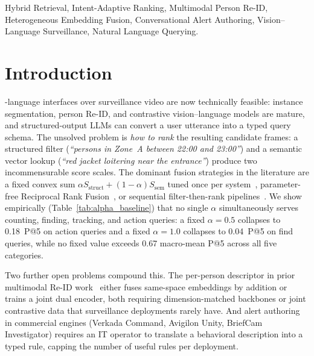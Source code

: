 ﻿\documentclass[conference]{IEEEtran}
\theoremstyle{definition}
\begin{document}
\begin{IEEEkeywords}
Hybrid Retrieval, Intent-Adaptive Ranking, Multimodal Person Re-ID, Heterogeneous Embedding Fusion, Conversational Alert Authoring, Vision--Language Surveillance, Natural Language Querying.
\end{IEEEkeywords}

\section{Introduction}

-language interfaces over surveillance video are now technically feasible: instance segmentation, person Re-ID, and contrastive vision--language models are mature, and structured-output LLMs can convert a user utterance into a typed query schema. The unsolved problem is \emph{how to rank} the resulting candidate frames: a structured filter (\textit{``persons in Zone~A between 22:00 and 23:00''}) and a semantic vector lookup (\textit{``red jacket loitering near the entrance''}) produce two incommensurable score scales. The dominant fusion strategies in the literature are a fixed convex sum $\alpha S_{\text{struct}} + (1-\alpha) S_{\text{sem}}$ tuned once per system~\cite{b7,b11,b12,b29}, parameter-free Reciprocal Rank Fusion~\cite{b27}, or sequential filter-then-rank pipelines~\cite{b30}. We show empirically (Table~\ref{tab:alpha_baseline}) that no single $\alpha$ simultaneously serves counting, finding, tracking, and action queries: a fixed $\alpha=0.5$ collapses to 0.18~P@5 on action queries and a fixed $\alpha=1.0$ collapses to 0.04~P@5 on find queries, while no fixed value exceeds 0.67 macro-mean P@5 across all five categories.

Two further open problems compound this. The per-person descriptor in prior multimodal Re-ID work~\cite{b22b,b32,b33,b34,b35} either fuses same-space embeddings by addition or trains a joint dual encoder, both requiring dimension-matched backbones or joint contrastive data that surveillance deployments rarely have. And alert authoring in commercial engines (Verkada Command, Avigilon Unity, BriefCam Investigator) requires an IT operator to translate a behavioral description into a typed rule, capping the number of useful rules per deployment.
\end{document}

